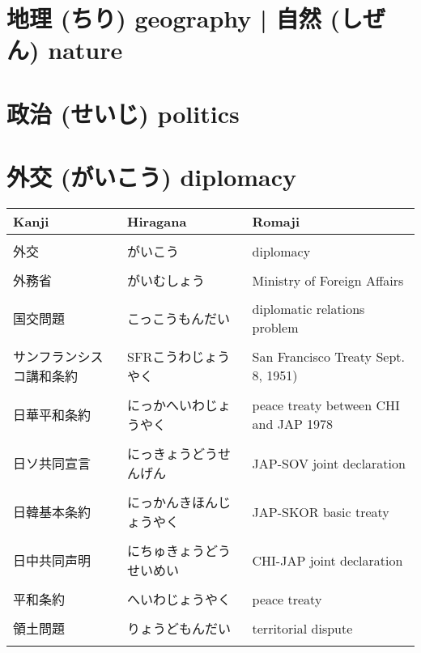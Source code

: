 \documentclass{article}
\begin{document}
 \large

\section{地理 (ちり) geography	| 自然 (しぜん) nature}
\section{政治 (せいじ) politics}
\section{外交 (がいこう) diplomacy}
    \begin{tabular}{  l | l | p{5cm} }
 Kanji 			& Hiragana 			& Romaji \\[5pt] \hline	\\[-1em]
 外交 			& がいこう 				& diplomacy   \\ \hline	\\[-1em]
 外務省			& がいむしょう			& Ministry of Foreign Affairs \\ \hline \\[-1em]
 国交問題			& こっこうもんだい			& diplomatic relations problem \\ \hline \\[-1em]
 サンフランシスコ講和条約  & SFRこうわじょうやく & San Francisco Treaty Sept. 8, 1951)\\ \hline \\[-1em]
 日華平和条約		& にっかへいわじょうやく  & peace treaty between CHI and JAP 1978\\ \hline \\[-1em]
 日ソ共同宣言				& にっきょうどうせんげん 	& JAP-SOV joint declaration \\ \hline \\[-1em]
 日韓基本条約				& にっかんきほんじょうやく	& JAP-SKOR basic treaty\\ \hline \\[-1em]
 日中共同声明				& にちゅきょうどうせいめい	& CHI-JAP joint declaration \\ \hline \\[-1em]
 平和条約					& へいわじょうやく 		& peace treaty \\ \hline \\[-1em]
 領土問題					& りょうどもんだい			& territorial dispute \\ \hline \\[-1em]

\end{tabular}
\end{document}
